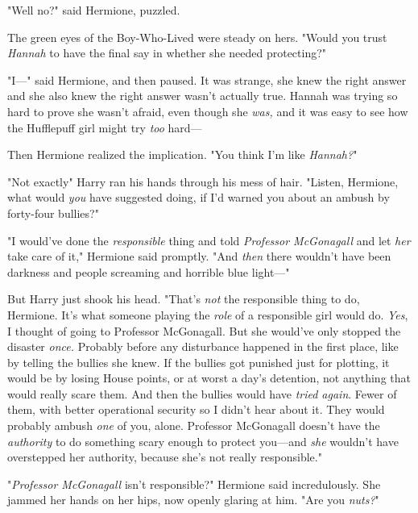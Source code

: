 "Well{\el} no?" said Hermione, puzzled.

The green eyes of the Boy-Who-Lived were steady on hers. "Would you trust
\emph{Hannah} to have the final say in whether she needed protecting?"

"I\mbox{---}" said Hermione, and then paused. It was strange, she knew the right
answer and she also knew the right answer wasn't actually true. Hannah was
trying so hard to prove she wasn't afraid, even though she \emph{was,} and it
was easy to see how the Hufflepuff girl might try \emph{too} hard---

Then Hermione realized the implication. "You think I'm like \emph{Hannah?}"

"Not{\el} exactly{\el}" Harry ran his hands through his mess of hair.
"Listen, Hermione, what would \emph{you} have suggested doing, if I'd warned
you about an ambush by forty-four bullies?"

"I would've done the \emph{responsible} thing and told \emph{Professor
McGonagall} and let \emph{her} take care of it," Hermione said promptly. "And
\emph{then} there wouldn't have been darkness and people screaming and horrible
blue light\mbox{---}"

But Harry just shook his head. "That's \emph{not} the responsible thing to do,
Hermione. It's what someone playing the \emph{role} of a responsible girl would
do. \emph{Yes}, I thought of going to Professor McGonagall. But she would've
only stopped the disaster \emph{once.} Probably before any disturbance happened
in the first place, like by telling the bullies she knew. If the bullies got
punished just for plotting, it would be by losing House points, or at worst a
day's detention, not anything that would really scare them. And then the
bullies would have \emph{tried again}. Fewer of them, with better operational
security so I didn't hear about it. They would probably ambush \emph{one} of
you, alone. Professor McGonagall doesn't have the \emph{authority} to do
something scary enough to protect you---and \emph{she} wouldn't have
overstepped her authority, because she's not really responsible."

"\emph{Professor McGonagall} isn't responsible?" Hermione said incredulously.
She jammed her hands on her hips, now openly glaring at him. "Are you
\emph{nuts?}"

